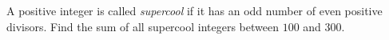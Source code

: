 A positive integer is called \emph{supercool} if it has an odd number of even positive divisors. Find the sum of all supercool integers between $100$ and $300$.
